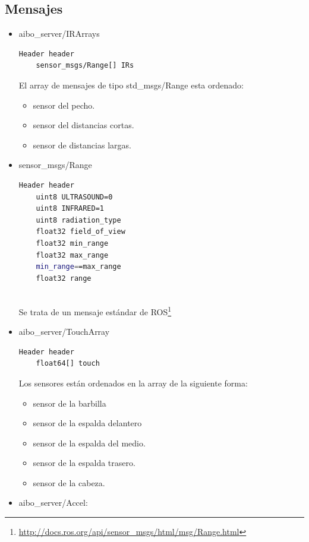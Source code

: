 \documentclass[12pt,a4paper,final,twoside]{book}
\begin{document}
\subsection{Mensajes}
\begin{itemize}
\item aibo{\_}server/IRArrays

\begin{lstlisting}[language=bash]
	Header header
	sensor_msgs/Range[] IRs
\end{lstlisting}

El array de mensajes de tipo std{\_}msgs/Range esta ordenado:
\begin{itemize}
\item sensor del pecho.
\item sensor del distancias cortas.
\item sensor de distancias largas.
\end{itemize}

\item sensor{\_}msgs/Range
\begin{lstlisting}[language=bash]
	Header header         
	uint8 ULTRASOUND=0
	uint8 INFRARED=1
	uint8 radiation_type             
	float32 field_of_view  
	float32 min_range      
	float32 max_range      
	min_range==max_range
	float32 range           
                       
\end{lstlisting}
Se trata de un mensaje estándar de ROS\footnote{\url{http://docs.ros.org/api/sensor_msgs/html/msg/Range.html}}
\item aibo{\_}server/TouchArray

\begin{lstlisting}[language=bash]
	Header header
	float64[] touch
\end{lstlisting}


Los sensores están ordenados en la array de la siguiente forma:

\begin{itemize}
\item sensor de la barbilla
\item sensor de la espalda delantero
\item sensor de la espalda del medio.
\item sensor de la espalda trasero.
\item sensor de la cabeza.
\end{itemize} 

\item aibo{\_}server/Accel:


\end{itemize}
\end{document}
